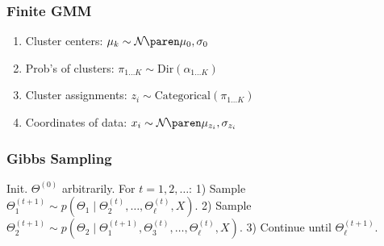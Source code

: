 








    


\subsubsection{Finite GMM}
\begin{enumerate}
    \item Cluster centers:\enskip
        $\mu_k \sim \Gauss{\mu_0, \sigma_0}$
    \item Prob's of clusters:\enskip
        $\pi_{1\ldots K} \sim \mathrm{Dir}(\alpha_{1\ldots K})$
    \item Cluster assignments:\enskip
        $z_i \sim \mathrm{Categorical}(\pi_{1\ldots K})$
    \item Coordinates of data:\enskip
        $x_i \sim \Gauss{\mu_{z_i}, \sigma_{z_i}}$
\end{enumerate}

\subsubsection{Gibbs Sampling}
Init. $\Theta^{(0)}$ arbitrarily. For $t=1,2,\ldots$: 1) Sample $\Theta_1^{(t+1)} \sim p(\Theta_1 \mid \Theta_2^{(t)}, \ldots, \Theta_\ell^{(t)}, X)$. 2) Sample $\Theta_2^{(t+1)} \sim p(\Theta_2 \mid \Theta_1^{(t+1)}, \Theta_3^{(t)}, \ldots, \Theta_\ell^{(t)}, X)$. 3) Continue until $\Theta^{(t+1)}_\ell$. \\

